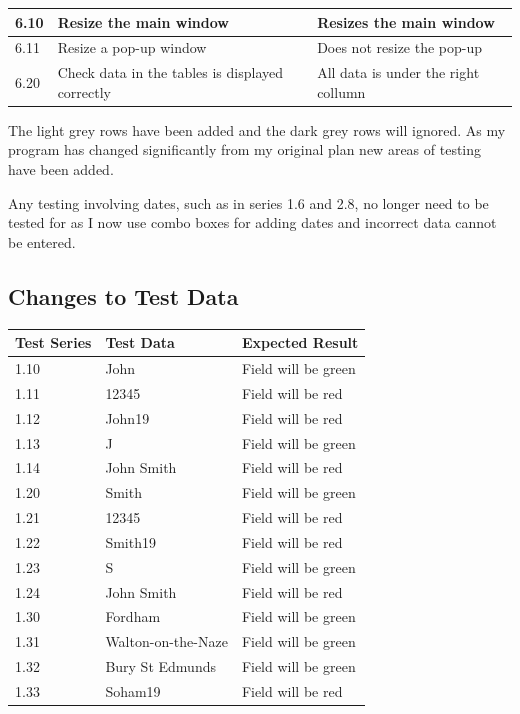 \begin{landscape}
\begin{center}
\begin{longtable}{|p{2cm}|p{5cm}|p{8cm}|}
        6.10 & Resize the main window & Resizes the main window \\ \hline
        6.11 & Resize a pop-up window & Does not resize the pop-up\\ \hline
        
        6.20 & Check data in the tables is displayed correctly & All data is under the right collumn \\ \hline

    \end{longtable}
\end{center}

The light grey rows have been added and the dark grey rows will ignored. As my program has changed significantly from my original plan new areas of testing have been added.

Any testing involving dates, such as in series 1.6 and 2.8, no longer need to be tested for as I now use combo boxes for adding dates and incorrect data cannot be entered.

\subsection{Changes to Test Data}

\begin{center}
    \begin{longtable}{|p{2cm}|p{5cm}|p{8cm}|}
        \hline
        \textbf{Test Series} & \textbf{Test Data} & \textbf{Expected Result}\\ \hline
        1.10 & John & Field will be green \\ \hline
        1.11 & 12345 & Field will be red \\ \hline
        1.12 & John19 & Field will be red \\ \hline
        1.13 & J & Field will be green\\ \hline
        1.14 & John Smith &  Field will be red\\ \hline
        
        1.20 & Smith & Field will be green \\ \hline
        1.21 & 12345 & Field will be red \\ \hline
        1.22 & Smith19 & Field will be red \\ \hline
        1.23 & S & Field will be green\\ \hline
        1.24 & John Smith &  Field will be red\\ \hline
        
        1.30 & Fordham & Field will be green \\ \hline
        1.31 & Walton-on-the-Naze & Field will be green \\ \hline
        1.32 & Bury St Edmunds & Field will be green \\ \hline
        1.33 & Soham19 & Field will be red\\ \hline


\end{longtable}
\end{center}
\end{landscape}

